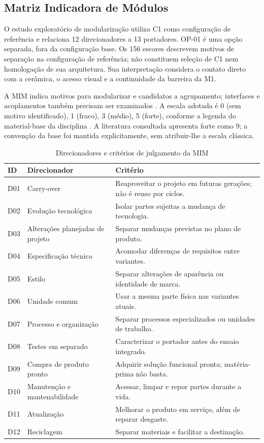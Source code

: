 \subsection{Matriz Indicadora de Módulos}
\label{sec:mim}

O estudo exploratório de modularização utiliza C1 como configuração de referência e relaciona 12 direcionadores a 13 portadores. OP-01 é uma opção separada, fora da configuração base. Os 156 escores descrevem motivos de separação na configuração de referência; não constituem seleção de C1 nem homologação de sua arquitetura. Sua interpretação considera o contato direto com a cerâmica, o acesso visual e a continuidade da barreira da M1.

A MIM indica motivos para modularizar e candidatos a agrupamento; interfaces e acoplamentos também precisam ser examinados \citep{erixon1998,blees2009}. A escala adotada é 0 (sem motivo identificado), 1 (fraco), 3 (médio), 5 (forte), conforme a legenda do material-base da disciplina \citep{basemim}. A literatura consultada apresenta forte como 9; a convenção da base foi mantida explicitamente, sem atribuir-lhe a escala clássica.

\begin{table}[H]
\centering\scriptsize\caption{Direcionadores e critérios de julgamento da MIM}\label{tab:mim-drivers}
\begin{tabularx}{\textwidth}{L{0.8cm}L{4.5cm}Y}
\toprule\textbf{ID}&\textbf{Direcionador}&\textbf{Critério}\\\midrule
D01 & Carry-over & Reaproveitar o projeto em futuras gerações; não é reuso por ciclos. \\
D02 & Evolução tecnológica & Isolar partes sujeitas a mudança de tecnologia. \\
D03 & Alterações planejadas de projeto & Separar mudanças previstas no plano de produto. \\
D04 & Especificação técnica & Acomodar diferenças de requisitos entre variantes. \\
D05 & Estilo & Separar alterações de aparência ou identidade de marca. \\
D06 & Unidade comum & Usar a mesma parte física nas variantes atuais. \\
D07 & Processo e organização & Separar processos especializados ou unidades de trabalho. \\
D08 & Testes em separado & Caracterizar o portador antes do ensaio integrado. \\
D09 & Compra de produto pronto & Adquirir solução funcional pronta; matéria-prima não basta. \\
D10 & Manutenção e mantenabilidade & Acessar, limpar e repor partes durante a vida. \\
D11 & Atualização & Melhorar o produto em serviço, além de reparar desgaste. \\
D12 & Reciclagem & Separar materiais e facilitar a destinação. \\
\bottomrule\end{tabularx}
\end{table}

